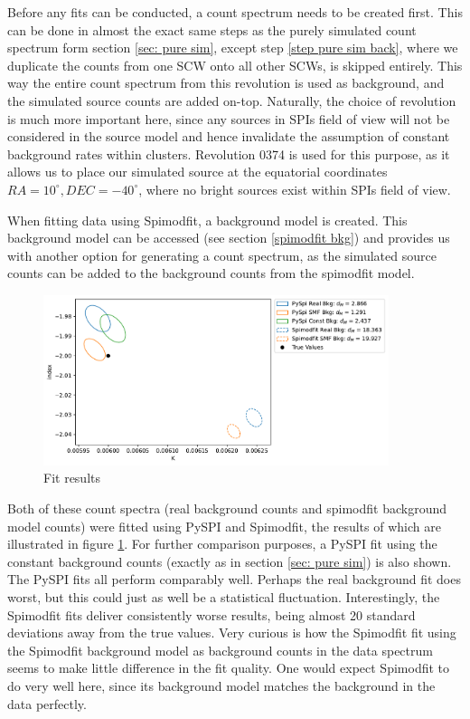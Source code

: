 \documentclass{report}
\begin{document}
Before any fits can be conducted, a count spectrum needs to be created first. This can be done in almost the exact same steps as the purely simulated count spectrum form section \ref{sec: pure sim}, except step \ref{step pure sim back}, where we duplicate the counts from one SCW onto all other SCWs, is skipped entirely. This way the entire count spectrum from this revolution is used as background, and the simulated source counts are added on-top. Naturally, the choice of revolution is much more important here, since any sources in SPIs field of view will not be considered in the source model and hence invalidate the assumption of constant background rates within clusters. Revolution 0374 is used for this purpose, as it allows us to place our simulated source at the equatorial coordinates $RA=10^\circ, DEC=-40^\circ$, where no bright sources exist within SPIs field of view.

When fitting data using Spimodfit, a background model is created. This background model can be accessed (see section \ref{spimodfit bkg}) and provides us with another option for generating a count spectrum, as the simulated source counts can be added to the background counts from the spimodfit model.

\begin{figure}[h]
  \centering
  \includegraphics[width=0.9\textwidth]{Images/SMF_Comparison/spimodfit_comparison_combined_plot.pdf}
  \caption{Fit results }
  \label{fig smf comparison}
\end{figure}

Both of these count spectra (real background counts and spimodfit background model counts) were fitted using PySPI and Spimodfit, the results of which are illustrated in figure \ref{fig smf comparison}. For further comparison purposes, a PySPI fit using the constant background counts (exactly as in section \ref{sec: pure sim}) is also shown. The PySPI fits all perform comparably well. Perhaps the real background fit does worst, but this could just as well be a statistical fluctuation. Interestingly, the Spimodfit fits deliver consistently worse results, being almost 20 standard deviations away from the true values. Very curious is how the Spimodfit fit using the Spimodfit background model as background counts in the data spectrum seems to make little difference in the fit quality. One would expect Spimodfit to do very well here, since its background model matches the background in the data perfectly.
\end{document}
